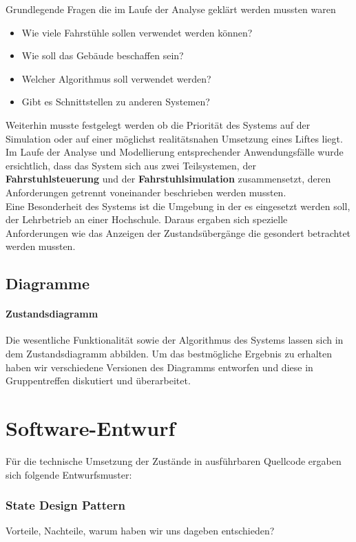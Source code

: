 Grundlegende Fragen die im Laufe der Analyse geklärt werden mussten waren
\begin{itemize}
	\item Wie viele Fahrstühle sollen verwendet werden können?
	\item Wie soll das Gebäude beschaffen sein?
	\item Welcher Algorithmus soll verwendet werden?
	\item Gibt es Schnittstellen zu anderen Systemen?
\end{itemize}
Weiterhin musste festgelegt werden ob die Priorität des Systems auf der 
Simulation oder auf einer möglichst realitätsnahen Umsetzung eines Liftes liegt.
Im Laufe der Analyse und Modellierung entsprechender Anwendungsfälle 
wurde ersichtlich, dass das System sich aus zwei Teilsystemen, der 
\textbf{Fahrstuhlsteuerung} und der \textbf{Fahrstuhlsimulation} zusammensetzt, 
deren Anforderungen getrennt voneinander beschrieben werden mussten.\\
Eine Besonderheit des Systems ist die Umgebung in der es eingesetzt werden 
soll, der Lehrbetrieb an einer Hochschule. Daraus ergaben sich spezielle 
Anforderungen wie das Anzeigen der Zustandsübergänge die gesondert betrachtet 
werden mussten.
\section{Diagramme}
\subsubsection{Zustandsdiagramm}
Die wesentliche Funktionalität sowie der Algorithmus des Systems lassen sich in 
dem Zustandsdiagramm abbilden. Um das bestmögliche Ergebnis zu erhalten haben 
wir verschiedene Versionen des Diagramms entworfen und diese in Gruppentreffen diskutiert und überarbeitet.


\chapter{Software-Entwurf}
Für die technische Umsetzung der Zustände in ausführbaren Quellcode ergaben sich folgende Entwurfsmuster:
\subsection*{State Design Pattern}
Vorteile, Nachteile, warum haben wir uns dageben entschieden?
